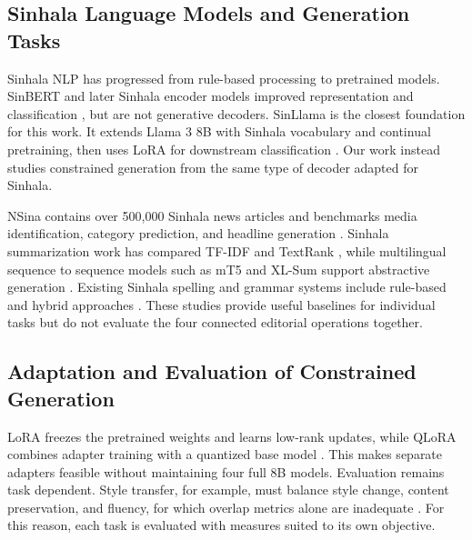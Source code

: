 \documentclass[a4paper,conference]{IEEEtran}
\begin{document}
\subsection{Sinhala Language Models and Generation Tasks}
Sinhala NLP has progressed from rule-based processing to pretrained models.
SinBERT and later Sinhala encoder models improved representation and
classification \cite{dhananjaya2022bertifying,ranasinghe2025encoder}, but are
not generative decoders. SinLlama is the closest foundation for this work.
It extends Llama 3 8B with Sinhala vocabulary and continual pretraining, then
uses LoRA for downstream classification \cite{aravinda2025sinllama}. Our work
instead studies constrained generation from the same type of decoder adapted for Sinhala.

NSina contains over 500,000 Sinhala news articles and benchmarks media
identification, category prediction, and headline generation
\cite{hettiarachchi2024nsina}. Sinhala summarization work has compared TF-IDF
and TextRank \cite{jahan2023summarization}, while multilingual sequence to sequence models such as mT5 and XL-Sum support abstractive generation
\cite{xue2021mt5,hasan2021xlsum}. Existing Sinhala spelling and grammar systems include rule-based and hybrid
approaches \cite{goonawardena2022grammar}.
These studies provide useful baselines for individual tasks but do not evaluate the four
connected editorial operations together.

\subsection{Adaptation and Evaluation of Constrained Generation}
LoRA freezes the pretrained weights and learns low-rank updates, while QLoRA
combines adapter training with a quantized base model
\cite{hu2022lora,dettmers2023qlora}. This makes separate adapters feasible
without maintaining four full 8B models. Evaluation remains task dependent.
Style transfer, for example, must balance style change, content preservation,
and fluency, for which overlap metrics alone are inadequate
\cite{ostheimer2024tst}. For this reason, each task is evaluated with measures suited to its own objective.
\end{document}
